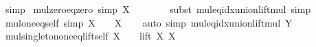 \begin{isabellebody}
\ simp%
\endisatagproof
{\isafoldproof}%
%
\isadelimproof
%
\endisadelimproof
%
\isadelimdocument
%
\endisadelimdocument
%
\isatagdocument
%
\isamarkuptrue%
%
\endisatagdocument
{\isafolddocument}%
%
\isadelimdocument
%
\endisadelimdocument
{}\isamarkupfalse%
\ mul{\isacharunderscore}{\kern0pt}zero{\isacharunderscore}{\kern0pt}eq{\isacharunderscore}{\kern0pt}zero\ {\isacharbrackleft}{\kern0pt}simp{\isacharbrackright}{\kern0pt}{\isacharcolon}{\kern0pt}\ {\isachardoublequoteopen}X\ {\isacharasterisk}{\kern0pt}\ {}\ {\isacharequal}{\kern0pt}\ {}{\isachardoublequoteclose}\isanewline
%
\isadelimproof
\ \ %
\endisadelimproof
%
\isatagproof
{}\isamarkupfalse%
\ {\isacharparenleft}{\kern0pt}subst\ mul{\isacharunderscore}{\kern0pt}eq{\isacharunderscore}{\kern0pt}idx{\isacharunderscore}{\kern0pt}union{\isacharunderscore}{\kern0pt}lift{\isacharunderscore}{\kern0pt}mul{\isacharparenright}{\kern0pt}\ simp%
\endisatagproof
{\isafoldproof}%
%
\isadelimproof
\isanewline
%
\endisadelimproof
\isanewline
{}\isamarkupfalse%
\ mul{\isacharunderscore}{\kern0pt}one{\isacharunderscore}{\kern0pt}eq{\isacharunderscore}{\kern0pt}self\ {\isacharbrackleft}{\kern0pt}simp{\isacharbrackright}{\kern0pt}{\isacharcolon}{\kern0pt}\ {\isachardoublequoteopen}X\ {\isacharasterisk}{\kern0pt}\ {}\ {\isacharequal}{\kern0pt}\ X{\isachardoublequoteclose}\isanewline
%
\isadelimproof
\ \ %
\endisadelimproof
%
\isatagproof
{}\isamarkupfalse%
\ {\isacharparenleft}{\kern0pt}auto\ simp{\isacharcolon}{\kern0pt}\ mul{\isacharunderscore}{\kern0pt}eq{\isacharunderscore}{\kern0pt}idx{\isacharunderscore}{\kern0pt}union{\isacharunderscore}{\kern0pt}lift{\isacharunderscore}{\kern0pt}mul{\isacharbrackleft}{\kern0pt}\ {\isacharquery}{\kern0pt}Y{\isacharequal}{\kern0pt}{}{\isacharbrackright}{\kern0pt}{\isacharparenright}{\kern0pt}%
\endisatagproof
{\isafoldproof}%
%
\isadelimproof
\isanewline
%
\endisadelimproof
\isanewline
{}\isamarkupfalse%
\ mul{\isacharunderscore}{\kern0pt}singleton{\isacharunderscore}{\kern0pt}one{\isacharunderscore}{\kern0pt}eq{\isacharunderscore}{\kern0pt}lift{\isacharunderscore}{\kern0pt}self{\isacharcolon}{\kern0pt}\ {\isachardoublequoteopen}X\ {\isacharasterisk}{\kern0pt}\ {\isacharbraceleft}{\kern0pt}{}{\isacharbraceright}{\kern0pt}\ {\isacharequal}{\kern0pt}\ lift\ X\ X{\isachardoublequoteclose}\isanewline
%
\isadelimproof
\ \ %
\endisadelimproof
%
\isatagproof
{}\isamarkupfalse%

\end{isabellebody}
